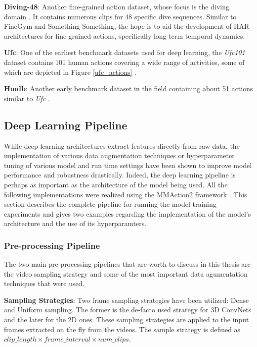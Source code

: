 \documentclass[extern,palatino]{cgMA}
\begin{document}
\bigskip
\noindent\textbf{Diving-48}: Another fine-grained action dataset, whose focus is the diving domain \cite{li2018resound}. It contains numerous clips for 48 specific dive sequences. Similar to FineGym and Something-Something, the hope is to aid the development of HAR architectures for fine-grained actions, specifically long-term temporal dynamics.

\bigskip
\noindent\textbf{Ufc}: One of the earliest benchmark datasets used for deep learning, the \textit{Ufc101} dataset contains 101 human actions covering a wide range of activities, some of which are depicted in Figure \ref{ufc_actions} \cite{soomro2012ucf101}.

\bigskip
\noindent\textbf{Hmdb}: Another early benchmark dataset in the field containing about 51 actions similar to \textit{Ufc} \cite{kuehne2011hmdb}.

\newpage
\subsection{Deep Learning Pipeline}
\label{dl_pipeline}
While deep learning architectures extract features directly from raw data, the implementation of various data augmentation techniques or hyperparameter tuning of various model and run time settings have been shown to improve model performance and robustness drastically. Indeed, the deep learning pipeline is perhaps as important as the architecture of the model being used. All the following implementations were realized using the MMAction2 framework \cite{2020mmaction2}. This section describes the complete pipeline for running the model training experiments and gives two examples regarding the implementation of the model's architecture and the use of its hyperparamters.

\subsubsection{Pre-processing Pipeline}

The two main pre-processing pipelines that are worth to discuss in this thesis are the video sampling strategy and some of the most important data agumentation techniques that were used.

\bigskip

\noindent\textbf{Sampling Strategies}: Two frame sampling strategies have been utilized: Dense and Uniform sampling. The former is the de-facto used strategy for 3D ConvNets and the later for the 2D ones. These sampling strategies are applied to the input frames extracted on the fly from the videos. The sample strategy is defined as $clip\_length \times frame\_interval \times num\_clips$.
\end{document}
